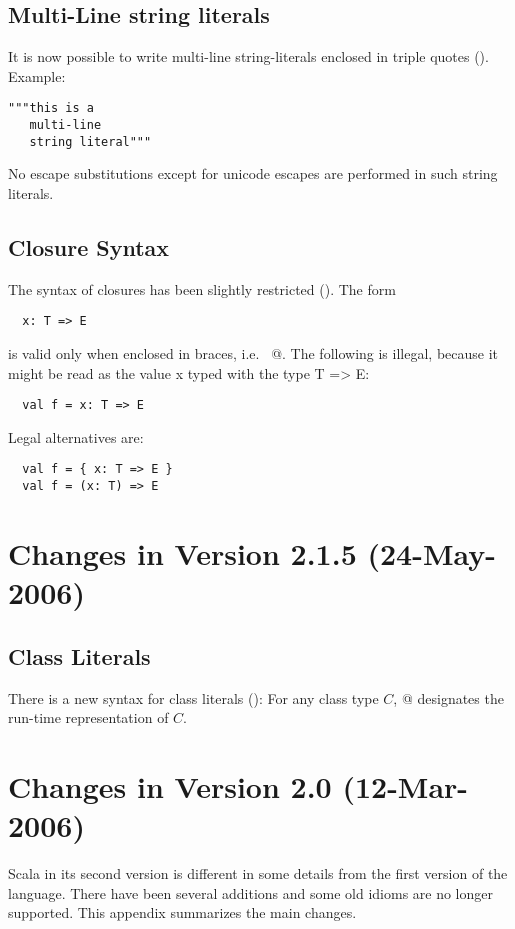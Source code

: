 \subsection*{Multi-Line string literals} It is now possible to write
multi-line string-literals enclosed in triple quotes
(). 
Example:
\begin{lstlisting}
"""this is a
   multi-line
   string literal"""
\end{lstlisting}
No escape substitutions except for unicode escapes are performed in
such string literals.

\subsection*{Closure Syntax}

The syntax of closures has been slightly restricted (). The form
\begin{lstlisting}
  x: T => E
\end{lstlisting}
is valid only when enclosed in braces, i.e. ~@. 
The following is illegal, because it might be read as the value x typed with the type T => E:
\begin{lstlisting}
  val f = x: T => E
\end{lstlisting}
Legal alternatives are:
\begin{lstlisting}
  val f = { x: T => E }
  val f = (x: T) => E
\end{lstlisting}

\section*{Changes in Version 2.1.5 (24-May-2006)}

\subsection*{Class Literals} There is a new syntax for class literals
(): For any class type $C$,
\lstinline@classOf[$C$]@ designates the run-time representation of
$C$.

\section*{Changes in Version 2.0 (12-Mar-2006)}

Scala in its second version is different in some details from the
first version of the language. There have been several additions and
some old idioms are no longer supported. This appendix summarizes
the main changes.

